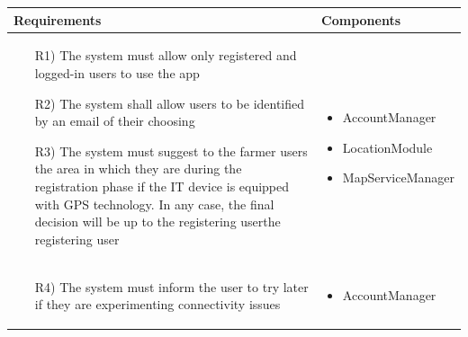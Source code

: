 \documentclass[table, 12pt]{article}
\begin{document}
\begin{longtable}{|p{}|p{}|}
    \hline
    \textbf{Requirements} & \textbf{Components} \\\hline\hline
    \begin{itemize}
        \item[R1)] The system must allow only registered and logged-in users to use the app
        \item[R2)] The system shall allow users to be identified by an email of their choosing
        \item[R3)] The system must suggest to the farmer users the area in which they are during the registration phase if the IT device is equipped with GPS technology. In any case, the final decision will be up to the registering userthe registering user
    \end{itemize}
    & 
    \begin{itemize}
        \item AccountManager
        \item LocationModule
        \item MapServiceManager
    \end{itemize}
    \\\hline

    \begin{itemize}
        \item[R4)] The system must inform the user to try later if they are experimenting connectivity issues
    \end{itemize}
    & 
    \begin{itemize}
        \item AccountManager
    \end{itemize}
    \\\hline


\end{longtable}
\end{document}
